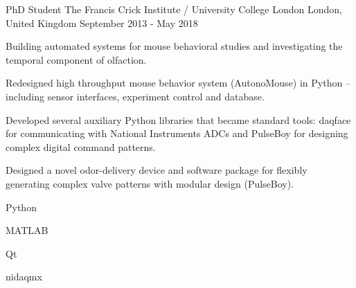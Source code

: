 \begin{cventries}
  \cventry%
    {PhD Student} %
    {The Francis Crick Institute / University College London} %
    {London, United Kingdom} %
    {September 2013 \-- May 2018} %
    {%
      \begin{cvsentence}Building automated systems for mouse behavioral studies and investigating the temporal component of olfaction.\end{cvsentence}
      \begin{cvitems} %
        \item {Redesigned high throughput mouse behavior system (AutonoMouse) in Python – including sensor interfaces, experiment control and database.}
        \item {Developed several auxiliary Python libraries that became standard tools: daqface for communicating with National Instruments ADCs and PulseBoy for designing complex digital command patterns.  }
        \item {Designed a novel odor-delivery device and software package for ﬂexibly generating complex valve patterns with modular design (PulseBoy).}
      \end{cvitems}
    }
    \begin{cventryskills}
      \item Python
      \item MATLAB
      \item Qt
      \item nidaqmx
    \end{cventryskills}
\end{cventries}

